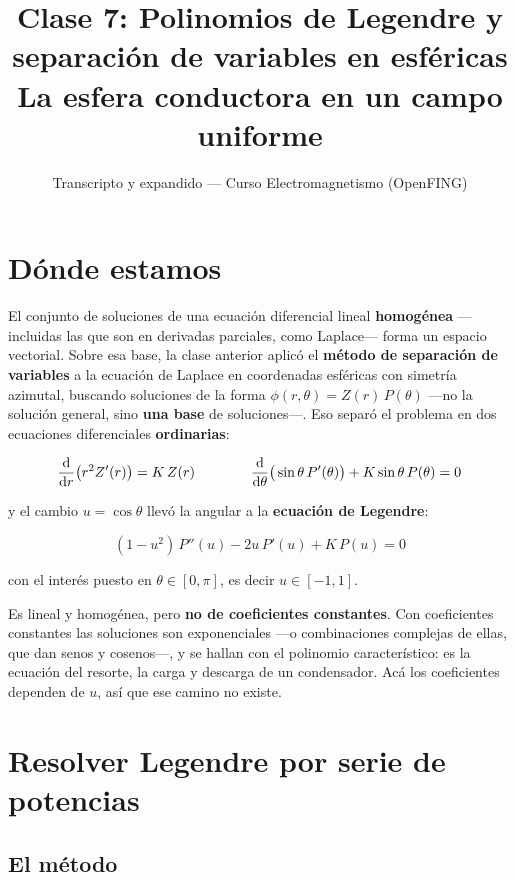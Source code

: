 \documentclass[12pt,a4paper]{article}
\title{\textbf{Clase 7: Polinomios de Legendre y separación de variables en esféricas} \\[0.3em]
        \large{La esfera conductora en un campo uniforme}}
\author{Transcripto y expandido --- Curso Electromagnetismo (OpenFING)}
\date{}
\begin{document}
\maketitle
\thispagestyle{empty}
\newpage

\tableofcontents
\newpage


\section{Dónde estamos}

El conjunto de soluciones de una ecuación diferencial lineal \textbf{homogénea}
---incluidas las que son en derivadas parciales, como Laplace--- forma un espacio
vectorial. Sobre esa base, la clase anterior aplicó el \textbf{método de
separación de variables} a la ecuación de Laplace en coordenadas esféricas con
simetría azimutal, buscando soluciones de la forma $\phi(r,\theta) = Z(r)\,P(\theta)$
---no la solución general, sino \textbf{una base} de soluciones---. Eso separó el
problema en dos ecuaciones diferenciales \textbf{ordinarias}:

\[
\dv{r}\big(r^2 Z'(r)\big) = K\,Z(r)
\qquad\qquad
\dv{\theta}\big(\sin\theta\,P'(\theta)\big) + K\sin\theta\,P(\theta) = 0
\]

y el cambio $u = \cos\theta$ llevó la angular a la \textbf{ecuación de Legendre}:

\[
(1-u^2)\,P''(u) - 2u\,P'(u) + K\,P(u) = 0
\]

con el interés puesto en $\theta\in[0,\pi]$, es decir $u\in[-1,1]$.

\begin{warnbox}[El obstáculo]
Es lineal y homogénea, pero \textbf{no de coeficientes constantes}. Con
coeficientes constantes las soluciones son exponenciales ---o combinaciones
complejas de ellas, que dan senos y cosenos---, y se hallan con el polinomio
característico: es la ecuación del resorte, la carga y descarga de un
condensador. Acá los coeficientes dependen de $u$, así que ese camino no existe.
\end{warnbox}

\section{Resolver Legendre por serie de potencias}

\subsection{El método}
\end{document}
